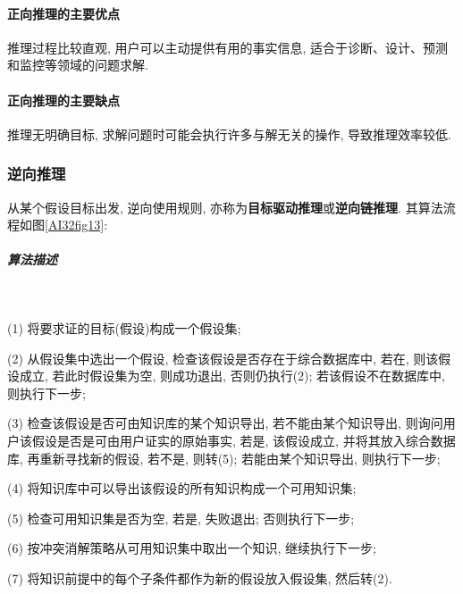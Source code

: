 \paragraph{正向推理的主要优点}
推理过程比较直观, 用户可以主动提供有用的事实信息, 适合于诊断、设计、预测和监控等领域的问题求解.
\paragraph{正向推理的主要缺点}
推理无明确目标, 求解问题时可能会执行许多与解无关的操作, 导致推理效率较低.
\subsubsection{逆向推理}

从某个假设目标出发, 逆向使用规则, 亦称为\textbf{目标驱动推理}或\textbf{逆向链推理}.
其算法流程如图\ref{AI32fig13}:
\subparagraph{算法描述}~{}

(1) 将要求证的目标(假设)构成一个假设集;

(2) 从假设集中选出一个假设, 检查该假设是否存在于综合数据库中, 若在, 则该假设成立, 若此时假设集为空, 则成功退出, 否则仍执行(2); 若该假设不在数据库中, 则执行下一步;

(3) 检查该假设是否可由知识库的某个知识导出, 若不能由某个知识导出, 则询问用户该假设是否是可由用户证实的原始事实, 若是, 该假设成立, 并将其放入综合数据库, 再重新寻找新的假设, 若不是, 则转(5); 若能由某个知识导出, 则执行下一步;

(4) 将知识库中可以导出该假设的所有知识构成一个可用知识集;

(5) 检查可用知识集是否为空, 若是, 失败退出; 否则执行下一步;

(6) 按冲突消解策略从可用知识集中取出一个知识, 继续执行下一步;

(7) 将知识前提中的每个子条件都作为新的假设放入假设集, 然后转(2).

